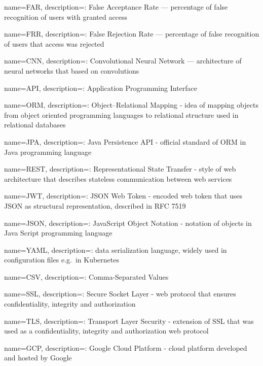 \makeglossaries

{
name=FAR,
description={: False Acceptance Rate --- percentage of false recognition of users with granted access}
}

{
name=FRR,
description={: False Rejection Rate --- percentage of false recognition of users that access was rejected}
}

{
name=CNN,
description={: Convolutional Neural Network --- architecture of neural networks that based on convolutions}
}

{
name=API,
description={: Application Programming Interface}
}

{
name=ORM,
description={: Object–Relational Mapping - idea of mapping objects from object oriented programming languages to relational structure used in relational databases}
}

{
name=JPA,
description={: Java Persistence API - official standard of ORM in Java programming language}
}

{
name=REST,
description={: Representational State Transfer - style of web architecture that describes stateless communication between web services}
}

{
name=JWT,
description={: JSON Web Token - encoded web token that uses JSON as structural representation, described in RFC 7519}
}

{
name=JSON,
description={: JavaScript Object Notation - notation of objects in Java Script programming language}
}

{
name=YAML,
description={: data serialization language, widely used in configuration files e.g.\ in Kubernetes}
}

{
name=CSV,
description={: Comma-Separated Values}
}

{
name=SSL,
description={: Secure Socket Layer - web protocol that ensures confidentiality, integrity and authorization}
}

{
name=TLS,
description={: Transport Layer Security - extension of SSL that was used as a confidentiality, integrity and authorization web protocol}
}

{
name=GCP,
description={: Google Cloud Platform - cloud platform developed and hosted by Google}
}

